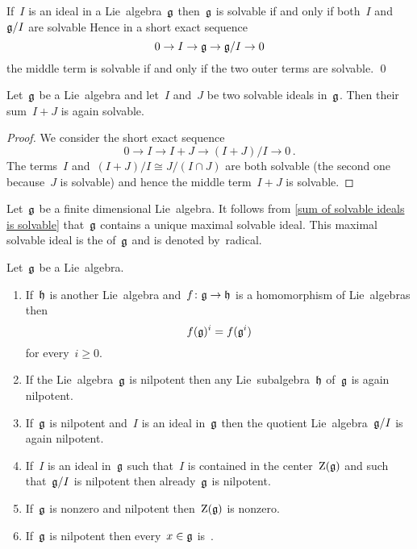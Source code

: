 \begin{corollary}
  \label{solvable via ses}
  If~$I$ is an ideal in a Lie~algebra~$\mathfrak{g}$ then~$\mathfrak{g}$ is solvable if and only if both~$I$ and~$\mathfrak{g}/I$ are solvable
  Hence in a short exact sequence
  \[
    0
    \to
    I
    \to
    \mathfrak{g}
    \to
    \mathfrak{g}/I
    \to
    0
  \]
  the middle term is solvable if and only if the two outer terms are solvable.
  \qed
\end{corollary}


\begin{corollary}
  \label{sum of solvable ideals is solvable}
  Let~$\mathfrak{g}$ be a Lie~algebra and let~$I$ and~$J$ be two solvable ideals in~$\mathfrak{g}$.
  Then their sum~$I + J$ is again solvable.
\end{corollary}


\begin{proof}
  We consider the short exact sequence
  \[
    0
    \to
    I
    \to
    I+J
    \to
    (I+J)/I
    \to
    0 \,.
  \]
  The terms~$I$ and~$(I+J)/I \cong J/(I \cap J)$ are both solvable (the second one because~$J$ is solvable) and hence the middle term~$I+J$ is solvable.
\end{proof}


\begin{definition}
 Let~$\mathfrak{g}$ be a finite dimensional Lie~algebra.
 It follows from \cref{sum of solvable ideals is solvable} that~$\mathfrak{g}$ contains a unique maximal solvable ideal. This maximal solvable ideal is the  of~$\mathfrak{g}$ and is denoted by~\gls*{radical}.
\end{definition}


\begin{proposition}
  \label{properties of nilpotence}
  Let~$\mathfrak{g}$ be a Lie~algebra.
  \begin{enumerate}
    \item
      If~$\mathfrak{h}$ is another Lie~algebra and~$f \colon \mathfrak{g} \to \mathfrak{h}$ is a homomorphism of Lie~algebras then
      \[
        f(\mathfrak{g})^i
        =
        f(\mathfrak{g}^i)
      \]
      for every~$i \geq 0$.
    \item
      If the Lie~algebra~$\mathfrak{g}$ is nilpotent then any Lie~subalgebra~$\mathfrak{h}$ of~$\mathfrak{g}$ is again nilpotent.
    \item
      If~$\mathfrak{g}$ is nilpotent and~$I$ is an ideal in~$\mathfrak{g}$ then the quotient Lie~algebra~$\mathfrak{g}/I$ is again nilpotent.
    \item
      If~$I$ is an ideal in~$\mathfrak{g}$ such that~$I$ is contained in the center~$\operatorname{Z}(\mathfrak{g})$ and such that~$\mathfrak{g}/I$ is nilpotent then already~$\mathfrak{g}$ is nilpotent.
    \item
      If~$\mathfrak{g}$ is nonzero and nilpotent then~$\operatorname{Z}(\mathfrak{g})$ is nonzero.
    \item
      If~$\mathfrak{g}$ is nilpotent then every~$x \in \mathfrak{g}$ is~{\adnilpotent}.
  \end{enumerate}
\end{proposition}


